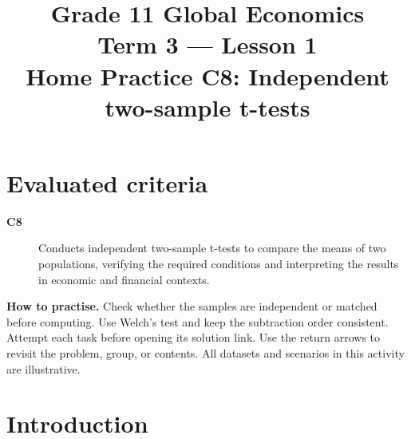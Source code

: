 \makeatletter
{}
\makeatother


\newcommand{\Pop}[1]{\HighlightStroke{GTenHLParameter}{#1}}
\newcommand{\Obs}[1]{\HighlightStroke{GTenHLValue}{#1}}
\newcommand{\Design}[1]{\HighlightStroke{GTenHLThird}{#1}}
\newcommand{\Result}[1]{\HighlightStroke{GTenHLOutcome}{#1}}

\title{Grade 11 Global Economics\\Term 3 --- Lesson 1\\Home Practice C8: Independent two-sample t-tests}
\author{}\date{}

\maketitle
\setcounter{tocdepth}{1}
\setcounter{secnumdepth}{2}
\label{toc}
\tableofcontents
\section*{Evaluated criteria}
\begin{description}
\item[\textbf{C8}] Conducts independent two-sample t-tests to compare the means of two populations, verifying the required conditions and interpreting the results in economic and financial contexts.
\end{description}
\textbf{How to practise.} Check whether the samples are independent or matched before computing. Use Welch's test and keep the subtraction order consistent. Attempt each task before opening its solution link. Use the return arrows to revisit the problem, group, or contents. All datasets and scenarios in this activity are illustrative.
\clearpage
\section{Introduction}\label{sec:introduction}
